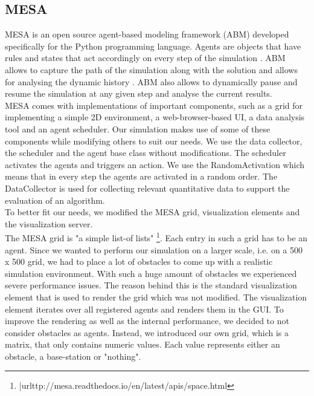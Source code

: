 \subsection{MESA}
MESA \cite{masad.2015} is an open source agent-based modeling framework (ABM) developed specifically for the Python programming language.  Agents are objects that have rules and states that act accordingly on every step of the simulation \cite{axtell.2000}. ABM allows to capture the path of the simulation along with the solution and allows for analysing the dynamic history \cite{axtell.2000}. ABM also allows to dynamically pause and resume the simulation at any given step and analyse the current results.\\
MESA comes with implementations of important components, such as a grid for implementing a simple 2D environment, a web-browser-based UI, a data analysis tool and an agent scheduler. Our simulation makes use of some of these components while modifying others to suit our needs. We use the data collector, the scheduler and the agent base class without modifications. The scheduler activates the agents and triggers an action. We use the RandomActivation which means that in every step the agents are activated in a random order. The DataCollector is used for collecting relevant quantitative data to support the evaluation of an algorithm.\\
To better fit our needs, we modified the MESA grid, visualization elements and the visualization server.  \\ %
The MESA grid is "a simple list-of lists" \footnote{|url{ttp://mesa.readthedocs.io/en/latest/apis/space.html}}. Each entry in such a grid has to be an agent. Since we wanted to perform our simulation on a larger scale, i.e. on a 500 x 500 grid, we had to place a lot of obstacles to come up with a realistic simulation environment. With such a huge amount of obstacles we experienced severe performance issues. The reason behind this is the standard visualization element that is used to render the grid which was not modified. The visualization element iterates over all registered agents and renders them in the GUI. To improve the rendering as well as the internal performance, we decided to not consider obstacles as agents. Instead, we introduced our own grid, which is a matrix, that only contains numeric values. Each value represents either an obstacle, a base-station or "nothing". 
 
